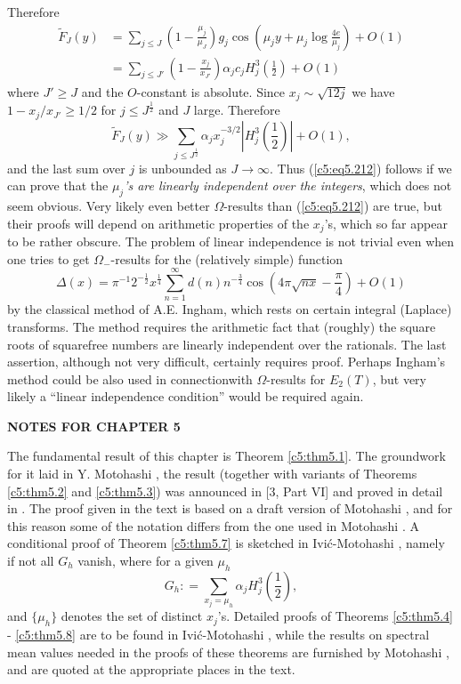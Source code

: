 Therefore
\begin{align*}
\tilde{F}_J (y) & = \sum\limits_{j \leq J} \left(1 -
\frac{\mu_j}{\mu_J} \right) g_j \cos \left(\mu_j y + \mu_j \log
\frac{4e}{\mu_j} \right) + O(1)\\ 
& = \sum\limits_{j \leq J'} \left(1-\frac{x_j}{x_{J'}}   \right)
\alpha_j c_j H^3_j \left(\frac{1}{2}\right) + O(1) 
\end{align*}
where $J' \geq J$ and the $O$-constant is absolute. Since $x_j
\sim\sqrt{12j}$ we have $1-x_j/x_{J'} \geq 1/2$ for $j \leq
J^{\frac{1}{2}}$ and $J$ large. Therefore  
$$
\tilde{F}_J(y) \gg \sum\limits_{j \leq J^{\frac{1}{2}}} \alpha_j
x^{-3/2}_j \left| H^3_j \left(\frac{1}{2} \right)\right| + O(1), 
$$
and the last sum over $j$ is unbounded as $J \to \infty$. Thus
(\ref{c5:eq5.212}) follows if we can prove that the \textit{$\mu_j$'s
  are linearly independent over the integers}, which does not seem
obvious. Very likely even better $\Omega$-results than
(\ref{c5:eq5.212}) are true, but their proofs will depend on
arithmetic properties of the $x_j$'s, which so far appear to be rather
obscure. The problem of linear independence is not trivial even when
one tries to get $\Omega_-$-results for the (relatively simple)
function 
$$
\Delta (x) = \pi^{-1} 2^{-\frac{1}{2}} x^{\frac{1}{4}}
\sum\limits^\infty_{n=1} d(n) n^{-\frac{3}{4}} \cos \left(4 \pi
\sqrt{nx} - \frac{\pi}{4} \right) + O (1) 
$$
by the classical method of A.E. Ingham, which rests on certain
integral (Laplace) transforms. The method requires the arithmetic fact
that (roughly) the square roots of squarefree numbers are linearly
independent over the rationals. The last assertion, although not very
difficult, certainly requires proof. Perhaps Ingham's method could be
also used  in connection\pageoriginale with $\Omega$-results for
$E_2(T)$, but very likely a ``linear independence condition'' would be
required again. 

\newpage

\begin{center}
{\bf NOTES FOR CHAPTER 5}
\end{center}

The fundamental result of this chapter is Theorem \ref{c5:thm5.1}. The
groundwork for it laid in Y. Motohashi \cite{Motohashi5}, the result
(together with variants of Theorems \ref{c5:thm5.2} and
\ref{c5:thm5.3}) was announced in [3, Part VI] and proved in detail in
\cite{Motohashi6}. The proof given in the text is based on a draft
version of Motohashi \cite{Motohashi6}, and for this reason some of
the notation differs from the one used in Motohashi
\cite{Motohashi6}. A conditional proof of Theorem \ref{c5:thm5.7} is
sketched in Ivi\'c-Motohashi \cite{Ivic and Motohashi1}, namely if not
all $G_h$ vanish, where for a given $\mu_h$ 
$$
G_h : = \sum\limits_{x_j = \mu_h} \alpha_j H^3_j \left(\frac{1}{2}
\right), 
$$
and $\{\mu_h\}$ denotes the set of distinct $x_j$'s. Detailed proofs
of Theorems \ref{c5:thm5.4} - \ref{c5:thm5.8} are to be found in
Ivi\'c-Motohashi \cite{Ivic and Motohashi2}, while the results on
spectral mean values needed in the proofs of these theorems are
furnished by Motohashi \cite{Motohashi7}, and are quoted at the
appropriate places in the text. 

